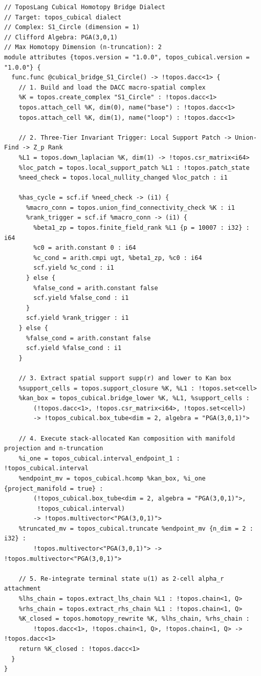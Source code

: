 \documentclass[acmsmall,screen,nonacm]{acmart}
\begin{document}
\begin{lstlisting}[float=htbp,style=mlircode,caption={Lowered \texttt{topos\_cubical} MLIR representation for $S^1$ cycle resolution.},label=lst:full-mlir]
// ToposLang Cubical Homotopy Bridge Dialect
// Target: topos_cubical dialect
// Complex: S1_Circle (dimension = 1)
// Clifford Algebra: PGA(3,0,1)
// Max Homotopy Dimension (n-truncation): 2
module attributes {topos.version = "1.0.0", topos_cubical.version = "1.0.0"} {
  func.func @cubical_bridge_S1_Circle() -> !topos.dacc<1> {
    // 1. Build and load the DACC macro-spatial complex
    %K = topos.create_complex "S1_Circle" : !topos.dacc<1>
    topos.attach_cell %K, dim(0), name("base") : !topos.dacc<1>
    topos.attach_cell %K, dim(1), name("loop") : !topos.dacc<1>

    // 2. Three-Tier Invariant Trigger: Local Support Patch -> Union-Find -> Z_p Rank
    %L1 = topos.down_laplacian %K, dim(1) -> !topos.csr_matrix<i64>
    %loc_patch = topos.local_support_patch %L1 : !topos.patch_state
    %need_check = topos.local_nullity_changed %loc_patch : i1
    
    %has_cycle = scf.if %need_check -> (i1) {
      %macro_conn = topos.union_find_connectivity_check %K : i1
      %rank_trigger = scf.if %macro_conn -> (i1) {
        %beta1_zp = topos.finite_field_rank %L1 {p = 10007 : i32} : i64
        %c0 = arith.constant 0 : i64
        %c_cond = arith.cmpi ugt, %beta1_zp, %c0 : i64
        scf.yield %c_cond : i1
      } else {
        %false_cond = arith.constant false
        scf.yield %false_cond : i1
      }
      scf.yield %rank_trigger : i1
    } else {
      %false_cond = arith.constant false
      scf.yield %false_cond : i1
    }

    // 3. Extract spatial support supp(r) and lower to Kan box
    %support_cells = topos.support_closure %K, %L1 : !topos.set<cell>
    %kan_box = topos_cubical.bridge_lower %K, %L1, %support_cells :
        (!topos.dacc<1>, !topos.csr_matrix<i64>, !topos.set<cell>)
        -> !topos_cubical.box_tube<dim = 2, algebra = "PGA(3,0,1)">

    // 4. Execute stack-allocated Kan composition with manifold projection and n-truncation
    %i_one = topos_cubical.interval_endpoint_1 : !topos_cubical.interval
    %endpoint_mv = topos_cubical.hcomp %kan_box, %i_one {project_manifold = true} :
        (!topos_cubical.box_tube<dim = 2, algebra = "PGA(3,0,1)">,
         !topos_cubical.interval)
        -> !topos.multivector<"PGA(3,0,1)">
    %truncated_mv = topos_cubical.truncate %endpoint_mv {n_dim = 2 : i32} :
        !topos.multivector<"PGA(3,0,1)"> -> !topos.multivector<"PGA(3,0,1)">

    // 5. Re-integrate terminal state u(1) as 2-cell alpha_r attachment
    %lhs_chain = topos.extract_lhs_chain %L1 : !topos.chain<1, Q>
    %rhs_chain = topos.extract_rhs_chain %L1 : !topos.chain<1, Q>
    %K_closed = topos.homotopy_rewrite %K, %lhs_chain, %rhs_chain :
        !topos.dacc<1>, !topos.chain<1, Q>, !topos.chain<1, Q> -> !topos.dacc<1>
    return %K_closed : !topos.dacc<1>
  }
}
\end{lstlisting}
\end{document}
